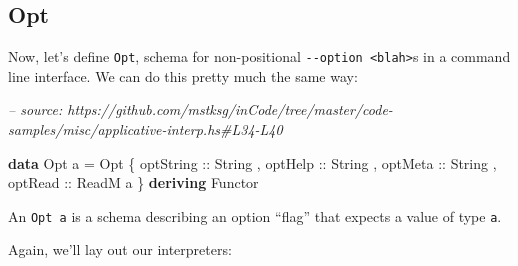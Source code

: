 \documentclass[]{article}
\newenvironment{Shaded}{}{}
\newcommand{\CommentTok}[1]{\textcolor[rgb]{0.38,0.63,0.69}{\textit{#1}}}
\newcommand{\DataTypeTok}[1]{\textcolor[rgb]{0.56,0.13,0.00}{#1}}
\newcommand{\KeywordTok}[1]{\textcolor[rgb]{0.00,0.44,0.13}{\textbf{#1}}}
\newcommand{\NormalTok}[1]{#1}
\newcommand{\OperatorTok}[1]{\textcolor[rgb]{0.40,0.40,0.40}{#1}}
\newcommand{\OtherTok}[1]{\textcolor[rgb]{0.00,0.44,0.13}{#1}}
\newcommand{\StringTok}[1]{\textcolor[rgb]{0.25,0.44,0.63}{#1}}
\begin{document}
\hypertarget{opt}{%
\subsection{Opt}\label{opt}}

Now, let's define \texttt{Opt}, schema for non-positional
\texttt{-\/-option\ \textless{}blah\textgreater{}}s in a command line interface.
We can do this pretty much the same way:

\begin{Shaded}
\begin{Highlighting}[]
\CommentTok{-- source: https://github.com/mstksg/inCode/tree/master/code-samples/misc/applicative-interp.hs#L34-L40}

\KeywordTok{data} \DataTypeTok{Opt}\NormalTok{ a }\OtherTok{=} \DataTypeTok{Opt}
\NormalTok{    \{}\OtherTok{ optString ::} \DataTypeTok{String}
\NormalTok{    ,}\OtherTok{ optHelp   ::} \DataTypeTok{String}
\NormalTok{    ,}\OtherTok{ optMeta   ::} \DataTypeTok{String}
\NormalTok{    ,}\OtherTok{ optRead   ::} \DataTypeTok{ReadM}\NormalTok{ a}
\NormalTok{    \}}
  \KeywordTok{deriving} \DataTypeTok{Functor}
\end{Highlighting}
\end{Shaded}

An \texttt{Opt\ a} is a schema describing an option ``flag'' that expects a
value of type \texttt{a}.

Again, we'll lay out our interpreters:

\begin{Shaded}
\end{Shaded}
\end{document}
